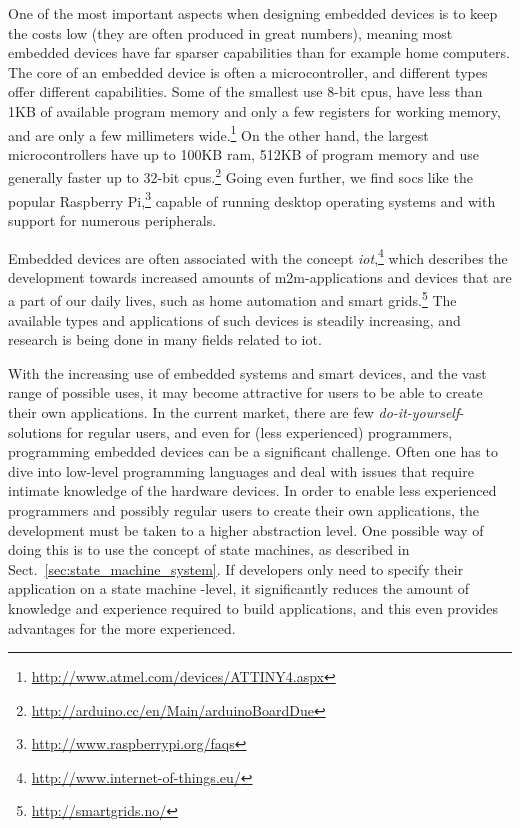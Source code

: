 \noindent
One of the most important aspects when designing embedded devices is to keep the costs low (they are often produced in great numbers), meaning most embedded devices have far sparser capabilities than for example home computers. The core of an embedded device is often a microcontroller, and different types offer different capabilities. Some of the smallest use 8-bit \glspl{cpu}, have less than 1KB of available program memory and only a few registers for working memory, and are only a few millimeters wide.\footnote{\url{http://www.atmel.com/devices/ATTINY4.aspx}} On the other hand, the largest microcontrollers have up to 100KB ram, 512KB of program memory and use generally faster up to 32-bit \glspl{cpu}.\footnote{\url{http://arduino.cc/en/Main/arduinoBoardDue}} Going even further, we find \glspl{soc} like the popular Raspberry Pi,\footnote{\url{http://www.raspberrypi.org/faqs}} capable of running desktop operating systems and with support for numerous peripherals.

\noindent
Embedded devices are often associated with the concept \emph{\gls{iot}},\footnote{\url{http://www.internet-of-things.eu/}} which describes the development towards increased amounts of \gls{m2m}-applications and devices that are a part of our daily lives, such as home automation and smart grids.\footnote{\url{http://smartgrids.no/}} The available types and applications of such devices is steadily increasing, and research is being done in many fields related to \gls{iot}.

\noindent
With the increasing use of embedded systems and smart devices, and the vast range of possible uses, it may become attractive for users to be able to create their own applications. In the current market, there are few \emph{do-it-yourself}-solutions for regular users, and even for (less experienced) programmers, programming embedded devices can be a significant challenge. Often one has to dive into low-level programming languages and deal with issues that require intimate knowledge of the hardware devices. In order to enable less experienced programmers and possibly regular users to create their own applications, the development must be taken to a higher abstraction level. One possible way of doing this is to use the concept of state machines, as described in Sect.~\ref{sec:state_machine_system}. If developers only need to specify their application on a state machine -level, it significantly reduces the amount of knowledge and experience required to build applications, and this even provides advantages for the more experienced.